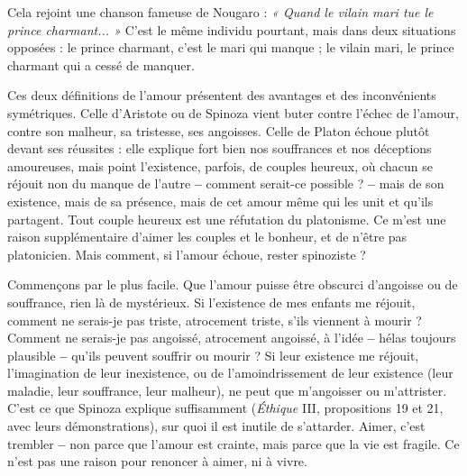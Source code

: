 Cela rejoint une chanson fameuse de Nougaro : {\it « Quand le vilain mari tue
le prince charmant... »} C’est le même individu pourtant, mais dans deux situations
opposées : le prince charmant, c’est le mari qui manque ; le vilain mari, le
prince charmant qui a cessé de manquer.

Ces deux définitions de l’amour présentent des avantages et des inconvénients
symétriques. Celle d’Aristote ou de Spinoza vient buter contre l'échec de
l'amour, contre son malheur, sa tristesse, ses angoisses. Celle de Platon échoue
plutôt devant ses réussites : elle explique fort bien nos souffrances et nos déceptions
amoureuses, mais point l'existence, parfois, de couples heureux, où
chacun se réjouit non du manque de l’autre {\bf --} comment serait-ce possible ? {\bf --}
mais de son existence, mais de sa présence, mais de cet amour même qui les
unit et qu’ils partagent. Tout couple heureux est une réfutation du platonisme.
Ce m'est une raison supplémentaire d’aimer les couples et le bonheur, et de
n’être pas platonicien. Mais comment, si l'amour échoue, rester spinoziste ?

Commençons par le plus facile. Que l'amour puisse être obscurci d’angoisse
ou de souffrance, rien là de mystérieux. Si l'existence de mes enfants me
réjouit, comment ne serais-je pas triste, atrocement triste, s'ils viennent à
mourir ? Comment ne serais-je pas angoissé, atrocement angoissé, à l’idée {\bf --}
hélas toujours plausible {\bf --} qu’ils peuvent souffrir ou mourir ? Si leur existence
me réjouit, l'imagination de leur inexistence, ou de l’amoindrissement de leur
existence (leur maladie, leur souffrance, leur malheur), ne peut que m’angoisser
ou m’attrister. C’est ce que Spinoza explique suffisamment ({\it Éthique} III, propositions
19 et 21, avec leurs démonstrations), sur quoi il est inutile de s’attarder.
Aimer, c’est trembler {\bf --} non parce que l’amour est crainte, mais parce que la vie
est fragile. Ce n’est pas une raison pour renoncer à aimer, ni à vivre.

